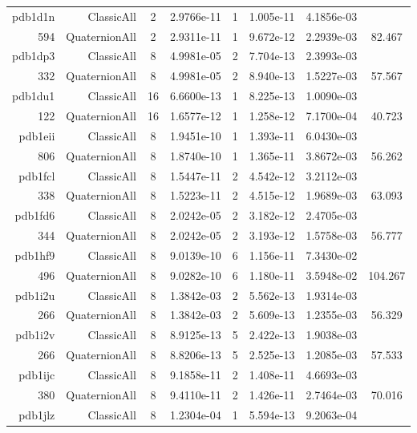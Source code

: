 \begin{xltabular}{\textwidth}{r|rcS[table-format=1.4e+2]cS[table-format=1.3e+2]S[table-format=1.4e+2]S[table-format=-1.3]}
pdb1d1n & ClassicAll & 2 & 2.9766e-11 & 1 & 1.005e-11 & 4.1856e-03 & \\
594 & QuaternionAll & 2 & 2.9311e-11 & 1 & 9.672e-12 & 2.2939e-03 & 82.467\\  \addlinespace
pdb1dp3 & ClassicAll & 8 & 4.9981e-05 & 2 & 7.704e-13 & 2.3993e-03 & \\
332 & QuaternionAll & 8 & 4.9981e-05 & 2 & 8.940e-13 & 1.5227e-03 & 57.567\\  \addlinespace
pdb1du1 & ClassicAll & 16 & 6.6600e-13 & 1 & 8.225e-13 & 1.0090e-03 & \\
122 & QuaternionAll & 16 & 1.6577e-12 & 1 & 1.258e-12 & 7.1700e-04 & 40.723\\  \addlinespace
pdb1eii & ClassicAll & 8 & 1.9451e-10 & 1 & 1.393e-11 & 6.0430e-03 & \\
806 & QuaternionAll & 8 & 1.8740e-10 & 1 & 1.365e-11 & 3.8672e-03 & 56.262\\  \addlinespace
pdb1fcl & ClassicAll & 8 & 1.5447e-11 & 2 & 4.542e-12 & 3.2112e-03 & \\
338 & QuaternionAll & 8 & 1.5223e-11 & 2 & 4.515e-12 & 1.9689e-03 & 63.093\\  \addlinespace
pdb1fd6 & ClassicAll & 8 & 2.0242e-05 & 2 & 3.182e-12 & 2.4705e-03 & \\
344 & QuaternionAll & 8 & 2.0242e-05 & 2 & 3.193e-12 & 1.5758e-03 & 56.777\\  \addlinespace
pdb1hf9 & ClassicAll & 8 & 9.0139e-10 & 6 & 1.156e-11 & 7.3430e-02 & \\
496 & QuaternionAll & 8 & 9.0282e-10 & 6 & 1.180e-11 & 3.5948e-02 & 104.267\\  \addlinespace
pdb1i2u & ClassicAll & 8 & 1.3842e-03 & 2 & 5.562e-13 & 1.9314e-03 & \\
266 & QuaternionAll & 8 & 1.3842e-03 & 2 & 5.609e-13 & 1.2355e-03 & 56.329\\  \addlinespace
pdb1i2v & ClassicAll & 8 & 8.9125e-13 & 5 & 2.422e-13 & 1.9038e-03 & \\
266 & QuaternionAll & 8 & 8.8206e-13 & 5 & 2.525e-13 & 1.2085e-03 & 57.533\\  \addlinespace
pdb1ijc & ClassicAll & 8 & 9.1858e-11 & 2 & 1.408e-11 & 4.6693e-03 & \\
380 & QuaternionAll & 8 & 9.4110e-11 & 2 & 1.426e-11 & 2.7464e-03 & 70.016\\  \addlinespace
pdb1jlz & ClassicAll & 8 & 1.2304e-04 & 1 & 5.594e-13 & 9.2063e-04 & \\

\end{xltabular}
